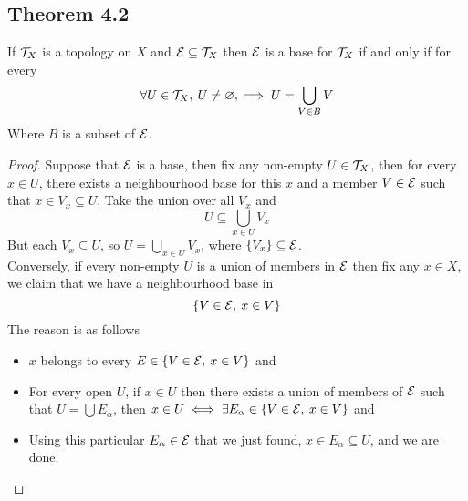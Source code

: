 \documentclass[../../main.tex]{subfiles}
\begin{document}
\subsection{Theorem 4.2}
\begin{wts}
    If $\mathcal{T}_X$ is a topology on $X$ and $\mathcal{E}\subseteq\mathcal{T}_X$ then $\mathcal{E}$ is a base for $\mathcal{T}_X$ if and only if for every 
    \[
    \forall U\in\mathcal{T}_X,\:U\neq\varnothing,\implies U=\bigcup_{V\in B}V
    \]
    Where $B$ is a subset of $\mathcal{E}$.
\end{wts}
\begin{proof}
    Suppose that $\mathcal{E}$ is a base, then fix any non-empty $U\in\mathcal{T}_X$, then for every $x\in U$, there exists a neighbourhood base for this $x$ and a member $V\in\mathcal{E}$ such that $x\in V_x\subseteq U$. Take the union over all $V_x$ and
    \[
    U\subseteq \bigcup_{x\in U}V_x
    \]
    But each $V_x\subseteq U$, so $U=\bigcup_{x\in U}V_x$, where $\{V_x\}\subseteq\mathcal{E}$.\\
    
    Conversely, if every non-empty $U$ is a union of members in $\mathcal{E}$ then fix any $x\in X$, we claim that we have a neighbourhood base in
    \[
    \{V\in\mathcal{E},\:x\in V\}
    \]
    The reason is as follows
    \begin{itemize}
        \item $x$ belongs to every $E\in \{V\in\mathcal{E},\:x\in V\}$ and
        \item For every open $U$, if $x\in U$ then there exists a union of members of $\mathcal{E}$ such that $U = \bigcup E_\alpha$, then $x\in U\iff\exists
        E_\alpha\in\{V\in\mathcal{E},\: x\in V\}$ and
        \item Using this particular $E_\alpha\in\mathcal{E}$ that we just found, $x\in E_\alpha\subseteq U$, and we are done.
    \end{itemize}
\end{proof}
\end{document}

